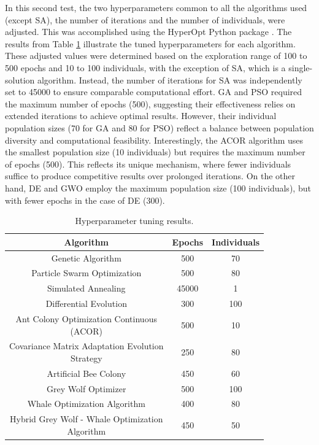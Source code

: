 \documentclass[Afour,sagev,times]{sagej}
\begin{document}
In this second test, the two hyperparameters common to all the algorithms used (except \gls{SA}), the number of iterations and the number of individuals, were adjusted. This was accomplished using the HyperOpt Python package \cite{Bergstra13,Hutter19}. The results from Table \ref{tab:hyperparameter_results} illustrate the tuned hyperparameters for each algorithm. These adjusted values were determined based on the exploration range of 100 to 500 epochs and 10 to 100 individuals, with the exception of \gls{SA}, which is a single-solution algorithm. Instead, the number of iterations for \gls{SA} was independently set to 45000 to ensure comparable computational effort. \gls{GA} and \gls{PSO} required the maximum number of epochs (500), suggesting their effectiveness relies on extended iterations to achieve optimal results. However, their individual population sizes (70 for \gls{GA} and 80 for \gls{PSO}) reflect a balance between population diversity and computational feasibility. Interestingly, the \gls{ACOR} algorithm uses the smallest population size (10 individuals) but requires the maximum number of epochs (500). This reflects its unique mechanism, where fewer individuals suffice to produce competitive results over prolonged iterations. On the other hand, \gls{DE} and \gls{GWO} employ the maximum population size (100 individuals), but with fewer epochs in the case of \gls{DE} (300).

\begin{table}[!ht]
\centering
\caption{Hyperparameter tuning results.}
\begin{adjustbox}{max width=0.45\textwidth}
\begin{tabular}{|c|c|c|}
\hline
\textbf{Algorithm} & \textbf{Epochs} & \textbf{Individuals} \\ \hline \hline
Genetic Algorithm & 500 & 70 \\ \hline
Particle Swarm Optimization & 500 & 80 \\ \hline
Simulated Annealing & 45000 & 1 \\ \hline
Differential Evolution & 300 & 100 \\ \hline
\makecell{Ant Colony Optimization Continuous \\ (ACOR)} & 500 & 10 \\ \hline
\makecell{Covariance Matrix Adaptation Evolution \\ Strategy} & 250 & 80 \\ \hline
Artificial Bee Colony & 450 & 60 \\ \hline
Grey Wolf Optimizer & 500 & 100 \\ \hline
Whale Optimization Algorithm & 400 & 80 \\ \hline
\makecell{Hybrid Grey Wolf - Whale Optimization \\ Algorithm} & 450 & 50 \\ \hline
\end{tabular}
\end{adjustbox}
\label{tab:hyperparameter_results}
\end{table}
\end{document}
